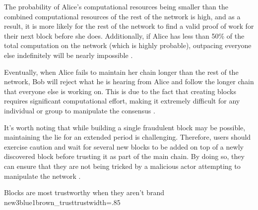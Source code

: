 The probability of Alice's computational resources being smaller than the combined computational resources of the rest of the network is
high, and as a result, it is more likely for the rest of the network to find a valid proof of work for their next block before she does.
Additionally, if Alice has less than 50\% of the total computation on the network (which is highly probable), outpacing everyone else
indefinitely will be nearly impossible \cite{nakamoto2008bitcoin}.

Eventually, when Alice fails to maintain her chain longer than the rest of the network, Bob will reject what he is hearing from Alice
and follow the longer chain that everyone else is working on. This is due to the fact that creating blocks requires significant computational
effort, making it extremely difficult for any individual or group to manipulate the consensus \cite{szabo2005bit}.

It's worth noting that while building a single fraudulent block may be possible, maintaining the lie for an extended period is
challenging. Therefore, users should exercise caution and wait for several new blocks to be added on top of a newly discovered
block before trusting it as part of the main chain. By doing so, they can ensure that they are not being tricked by a malicious
actor attempting to manipulate the network \cite{dupont2019cryptocurrencies}.

{Blocks are most trustworthy when they aren't brand new}{3blue1brown_trust}{trust}{width=.85\textwidth}%
